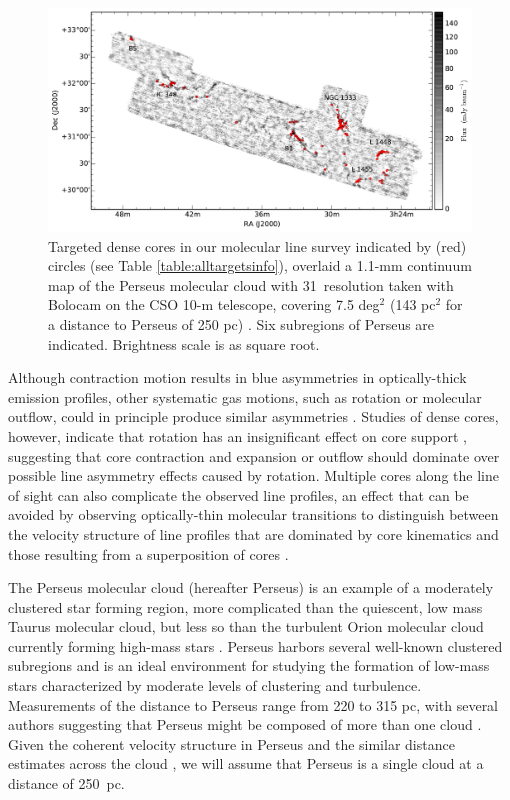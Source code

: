 \documentclass[iop,twocolappendix]{emulateapj}
\begin{document}
\begin{figure}[t]
\includegraphics[width=18cm]{Continuum.pdf}
\caption{Targeted dense cores in our molecular line survey indicated by (red) circles (see Table \ref{table:alltargetsinfo}), overlaid a 1.1-mm continuum map of the Perseus molecular cloud with 31\arcsec~resolution taken with Bolocam on the CSO 10-m telescope, covering 7.5 deg$^2$ (143 pc$^2$ for a distance to Perseus of 250 pc) \citep{Enoch2006}. Six subregions of Perseus are indicated. Brightness scale is as square root. \\ %
\label{fig:850mapalltargets}}
\end{figure}

Although contraction motion results in blue asymmetries in optically-thick emission profiles, other systematic gas motions, such as rotation or molecular outflow, could in principle produce similar asymmetries \citep{Snell1980, Adelson1988, Narayanan2002}. Studies of dense cores, however, indicate that rotation has an insignificant effect on core support \citep[][and references therein]{Bergin2007}, suggesting that core contraction and expansion or outflow should dominate over possible line asymmetry effects caused by rotation. Multiple cores along the line of sight can also complicate the observed line profiles, an effect that can be avoided by observing optically-thin molecular transitions to distinguish between the velocity structure of line profiles that are dominated by core kinematics and those resulting from a superposition of cores \citep{Mardones1997, DeVries2005}.

The Perseus molecular cloud (hereafter Perseus) is an example of a moderately clustered star forming region, more complicated than the quiescent, low mass Taurus molecular cloud, but less so than the turbulent Orion molecular cloud currently forming high-mass stars \citep{Ladd1993, Ladd1994, Kirk2007}. Perseus harbors several well-known clustered subregions and is an ideal environment for studying the formation of low-mass stars characterized by moderate levels of clustering and turbulence. Measurements of the distance to Perseus range from 220 to 315 pc, with several authors suggesting that Perseus might be composed of more than one cloud \citep[e.g.,][]{Cernis1990, Cernicharo1991, Cernis1993, Luhman2003}. Given the coherent velocity structure in Perseus and the similar distance estimates across the cloud \citep[e.g.,][]{Schlafly2014}, we will assume that Perseus is a single cloud at a distance of 250~pc.
\end{document}
